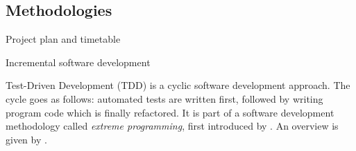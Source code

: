 \subsection{Methodologies}

Project plan and timetable

Incremental software development

Test-Driven Development (TDD) is a cyclic software development approach. The
cycle goes as follows: automated tests are written first, followed by writing
program code which is finally refactored. It is part of a software development
methodology called \textit{extreme programming}, first introduced by
\textcite{Beck2000xp}. An overview is given by \textcite{Copeland2001xp}.


